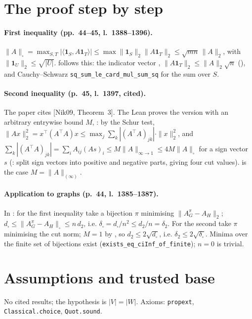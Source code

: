 \section{The proof step by step}

\paragraph{First inequality (pp.~44--45, l.~1388--1396).} $\|A\|_\square=\max_{S,T}|\langle\mathbf 1_S,A\mathbf 1_T\rangle|
\le\max\|\mathbf 1_S\|_2\|A\mathbf 1_T\|_2\le\sqrt{mn}\,\|A\|_2$, with $\|\mathbf 1_U\|_2\le\sqrt{|U|}$.
 follows this: the indicator vector , $\|A\mathbf 1_T\|_2\le
\|A\|_2\sqrt n$ (), and Cauchy--Schwarz \texttt{sq\_sum\_le\_card\_mul\_sum\_sq} for the sum
over $S$.

\paragraph{Second inequality (p.~45, l.~1397, cited).} The paper cites [Nik09, Theorem~3]. The Lean proves the version
with an arbitrary entrywise bound $M$, : by the Schur test,
$\|Ax\|_2^2=x^\top(A^\top A)x\le\max_j\sum_k|(A^\top A)_{jk}|\cdot\|x\|_2^2$, and
$\sum_k|(A^\top A)_{jk}|=\sum_iA_{ij}(As)_i\le M\|A\|_{\infty\to1}\le4M\|A\|_\square$ for a sign vector $s$
(: split sign vectors into positive and negative parts, giving four cut values).
 is the case $M=\|A\|_{(\infty)}$.

\paragraph{Application to graphs (p.~44, l.~1385--1387).} In : for the first inequality take a
bijection $\pi$ minimising $\|A^\pi_G-A_H\|_2$; $d_\square\le\|A^\pi_G-A_H\|_\square\le n\,d_2$, i.e.
$\delta_\square=d_\square/n^2\le d_2/n=\delta_2$. For the second take $\pi$ minimising the cut norm; $M=1$ by
, so $d_2\le2\sqrt{d_\square}$, i.e. $\delta_2\le2\sqrt{\delta_\square}$. Minima over
the finite set of bijections exist (\texttt{exists\_eq\_ciInf\_of\_finite}); $n=0$ is trivial.

\section{Assumptions and trusted base}
No cited results; the hypothesis is $|V|=|W|$. Axioms: \texttt{propext}, \texttt{Classical.choice},
\texttt{Quot.sound}.

